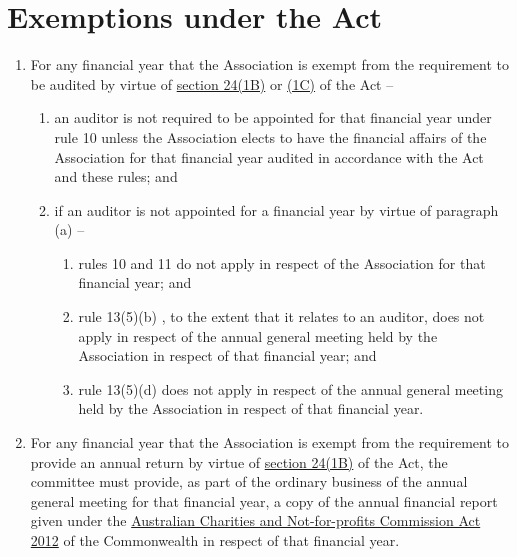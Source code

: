 \documentclass[a4paper,11pt]{article}
\begin{document}
\section{Exemptions under the Act}
\begin{enumerate}
	\item For any financial year that the Association is exempt from the requirement to be audited by virtue of \href{https://www.legislation.tas.gov.au/view/html/inforce/current/act-1964-064#GS24@Gs1B@EN}{section 24(1B)} or \href{https://www.legislation.tas.gov.au/view/html/inforce/current/act-1964-064#GS24@Gs1C@EN}{(1C)} of the Act --
	\begin{enumerate}
		\item an auditor is not required to be appointed for that financial year under rule 10 unless the Association elects to have the financial affairs of the Association for that financial year audited in accordance with the Act and these rules; and
		
		\item if an auditor is not appointed for a financial year by virtue of paragraph (a) --
		\begin{enumerate}
			\item rules 10 and 11 do not apply in respect of the Association for that financial year; and
			\item rule 13(5)(b) , to the extent that it relates to an auditor, does not apply in respect of the annual general meeting held by the Association in respect of that financial year; and
			\item rule 13(5)(d) does not apply in respect of the annual general meeting held by the Association in respect of that financial year.
		\end{enumerate}
	\end{enumerate}
	
	\item For any financial year that the Association is exempt from the requirement to provide an annual return by virtue of \href{https://www.legislation.tas.gov.au/view/html/inforce/current/act-1964-064#GS24@Gs1B@EN}{section 24(1B)} of the Act, the committee must provide, as part of the ordinary business of the annual general meeting for that financial year, a copy of the annual financial report given under the \href{https://www.legislation.gov.au/Details/C2016C00306}{Australian Charities and Not-for-profits Commission Act 2012} of the Commonwealth in respect of that financial year.
\end{enumerate}
\end{document}
